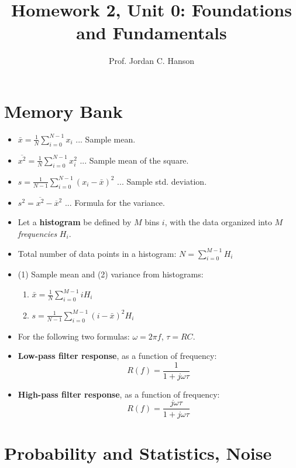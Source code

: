\documentclass{article}
\begin{document}
\twocolumn

\title{Homework 2, Unit 0: Foundations and Fundamentals}
\author{Prof. Jordan C. Hanson}

\maketitle

\section{Memory Bank}
\small
\begin{itemize}
\item $\bar{x} = \frac{1}{N}\sum_{i=0}^{N-1} x_i$ ... Sample mean.
\item $\overline{x^2} = \frac{1}{N}\sum_{i=0}^{N-1} x_i^2$ ... Sample mean of the square.
\item $s = \frac{1}{N-1}\sum_{i=0}^{N-1} (x_i - \bar{x})^2$ ... Sample std. deviation.
\item $s^2 = \overline{x^2} - \overline{x}^2$ ... Formula for the variance.
\item Let a \textbf{histogram} be defined by $M$ bins $i$, with the data organized into $M$ \textit{frequencies} $H_i$.
\item Total number of data points in a histogram: $N = \sum_{i=0}^{M-1} H_i$
\item (1) Sample mean and (2) variance from histograms: 
\begin{enumerate}
\item $\bar{x} = \frac{1}{N}\sum_{i=0}^{M-1} i H_i$
\item $s = \frac{1}{N-1}\sum_{i=0}^{M-1} (i-\bar{x})^2 H_i$
\end{enumerate}
\item For the following two formulas: $\omega = 2\pi f$, $\tau = RC$.
\item \textbf{Low-pass filter response}, as a function of frequency:
\begin{equation}
R(f) = \frac{1}{1+j\omega \tau}
\end{equation}
\item \textbf{High-pass filter response}, as a function of frequency:
\begin{equation}
R(f) = \frac{j\omega\tau}{1+j\omega \tau}
\end{equation}
\end{itemize}
\normalsize

\section{Probability and Statistics, Noise}
\end{document}
